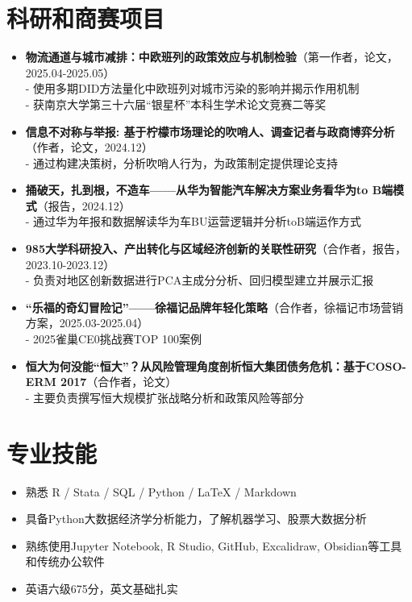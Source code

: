 \documentclass[a4paper,11pt]{ctexart}
\begin{document}
\vspace{1mm}
\section*{科研和商赛项目}
\begin{itemize}[leftmargin=*,itemsep=0.5em]
    \item \textbf{物流通道与城市减排：中欧班列的政策效应与机制检验}（第一作者，论文，2025.04-2025.05）\\
    - 使用多期DID方法量化中欧班列对城市污染的影响并揭示作用机制\\
    - 获南京大学第三十六届“银星杯”本科生学术论文竞赛二等奖
    \item \textbf{信息不对称与举报: 基于柠檬市场理论的吹哨人、调查记者与政商博弈分析}（作者，论文，2024.12）\\
    - 通过构建决策树，分析吹哨人行为，为政策制定提供理论支持
    \item \textbf{捅破天，扎到根，不造车——从华为智能汽车解决方案业务看华为to B端模式}（报告，2024.12）\\
    - 通过华为年报和数据解读华为车BU运营逻辑并分析toB端运作方式
    \item \textbf{985大学科研投入、产出转化与区域经济创新的关联性研究}（合作者，报告，2023.10-2023.12）\\
    - 负责对地区创新数据进行PCA主成分分析、回归模型建立并展示汇报
    \item \textbf{“乐福的奇幻冒险记”——徐福记品牌年轻化策略}（合作者，徐福记市场营销方案，2025.03-2025.04）\\
    - 2025雀巢CE0挑战赛TOP 100案例
    \item \textbf{恒大为何没能“恒大”？从风险管理角度剖析恒大集团债务危机：基于COSO-ERM 2017}（合作者，论文）\\
    - 主要负责撰写恒大规模扩张战略分析和政策风险等部分
\end{itemize}

\section*{专业技能}
\begin{itemize}[leftmargin=*,itemsep=0.3em]
    \item 熟悉 R / Stata / SQL / Python / LaTeX / Markdown
    \item 具备Python大数据经济学分析能力，了解机器学习、股票大数据分析
    \item 熟练使用Jupyter Notebook, R Studio, GitHub, Excalidraw, Obsidian等工具和传统办公软件
    \item 英语六级675分，英文基础扎实
\end{itemize}
\end{document}
